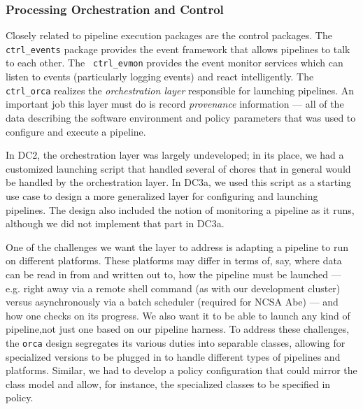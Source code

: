 
\subsubsection{Processing Orchestration and Control}

Closely related to pipeline execution packages are the control
packages.  The {\tt ctrl\_events} package provides the
event framework that allows pipelines to talk to each other.  The {\tt
ctrl\_evmon} provides the event monitor services which can listen to
events (particularly logging events) and react intelligently.  The
{\tt ctrl\_orca} realizes the {\it orchestration layer} responsible
for launching pipelines.  An important job this layer must do is
record {\it provenance} information --- all of the data describing the
software environment and policy parameters that was used to configure
and execute a pipeline.  

\label{sec:PipelineOrchestration}

In DC2, the orchestration layer was largely undeveloped; in its place, we
had a customized launching script that handled several of chores that
in general would be handled by the orchestration layer.  In DC3a, we
used this script as a starting use case to design a more generalized
layer for configuring and launching pipelines.  The design also
included the notion of monitoring a pipeline as it runs, although we did
not implement that part in DC3a.  

One of the challenges we want the layer to address is adapting a
pipeline to run on different platforms.  These platforms may differ in
terms of, say, where data can be read in from and written out to, how
the pipeline must be launched --- e.g. right away via a remote shell
command (as with our development cluster) versus asynchronously via a
batch scheduler (required for NCSA Abe) --- and how one checks on its
progress.  We also want it to be able to launch any kind of
pipeline,not just one based on our pipeline harness.  To address
these challenges, the {\tt orca} design segregates its various duties
into separable classes, allowing for specialized versions to be
plugged in to handle different types of pipelines and platforms.
Similar, we had to develop a policy configuration that could mirror
the class model and allow, for instance, the specialized classes to be
specified in policy.  

